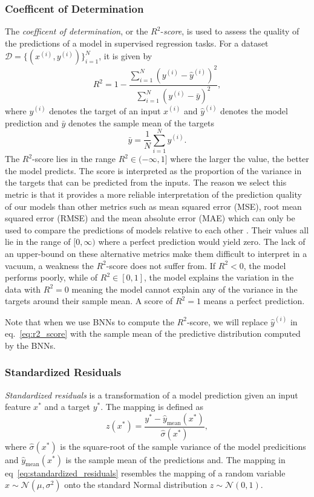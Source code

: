 \subsubsection{Coefficent of Determination}
The \textit{coefficent of determination}, or the $R^2$-\textit{score}, is used to assess the quality of the predictions of a model in supervised regression tasks. For a dataset $\mathcal{D} = \{(x^{(i)}, y^{(i)})\}_{i=1}^N$, it is given by
\begin{equation}\label{eq:r2_score}
    R^2 = 1 - \frac{\sum_{i=1}^N (y^{(i)} - \hat{y}^{(i)})^2}{\sum_{i=1}^N (y^{(i)} - \bar{y})^2},
\end{equation}
where $y^{(i)}$ denotes the target of an input $x^{(i)}$ and $\hat{y}^{(i)}$ denotes the model prediction and $\bar{y}$ denotes the sample mean of the targets
\begin{equation}
    \bar{y} = \frac{1}{N}\sum_{i=1}^N y^{(i)}.
\end{equation}
The $R^2$-score lies in the range $R^2 \in (-\infty, 1]$ where the larger the value, the better the model predicts. The score is interpreted as the proportion of the variance in the targets that can be predicted from the inputs. The reason we select this metric is that it provides a more reliable interpretation of the prediction quality of our models than other metrics such as mean squared error (MSE), root mean squared error (RMSE) and the mean absolute error (MAE) which can only be used to compare the predictions of models relative to each other \cite{r2_score}. Their values all lie in the range of $[0, \infty)$ where a perfect prediction would yield zero. The lack of an upper-bound on these alternative metrics make them difficult to interpret in a vacuum, a weakness the $R^2$-score does not suffer from. If $R^2 < 0$, the model performs poorly, while of $R^2 \in [0, 1]$, the model explains the variation in the data with $R^2 = 0$ meaning the model cannot explain any of the variance in the targets around their sample mean. A score of $R^2 = 1$ means a perfect prediction.

Note that when we use BNNs to compute the $R^2$-score, we will replace $\hat{y}^{(i)}$ in eq.~\eqref{eq:r2_score} with the sample mean of the predictive distribution computed by the BNNs. 

\subsubsection{Standardized Residuals}
\textit{Standardized residuals} is a transformation of a model prediction given an input feature $x^*$ and a target $y^*$. The mapping is defined as
\begin{equation}\label{eq:standardized_residuals}
    z(x^*) = \frac{y^* - \hat{y}_\text{mean}(x^*)}{\hat{\sigma}(x^*)},
\end{equation}
where $\hat{\sigma}(x^*)$ is the square-root of the sample variance of the model predicitions and $\hat{y}_\text{mean}(x^*)$ is the sample mean of the predictions and. The mapping in eq~\eqref{eq:standardized_residuals} resembles the mapping of a random variable $x \sim \mathcal{N}(\mu, \sigma^2)$ onto the standard Normal distribution $z \sim \mathcal{N}(0, 1)$.


